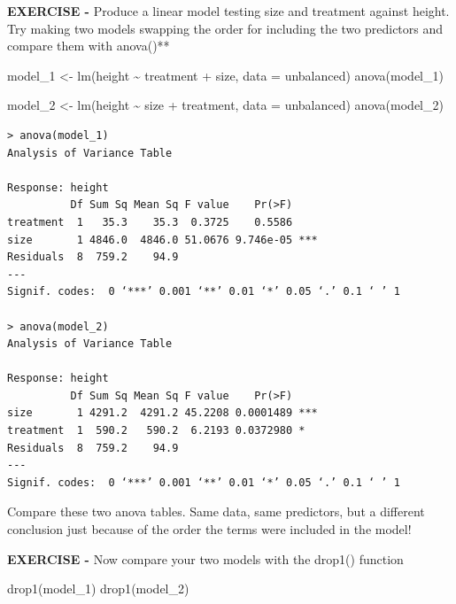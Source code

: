 \documentclass[
]{book}
\newenvironment{Shaded}{\begin{snugshade}}{\end{snugshade}}
\newcommand{\AttributeTok}[1]{\textcolor[rgb]{0.77,0.63,0.00}{#1}}
\newcommand{\FunctionTok}[1]{\textcolor[rgb]{0.00,0.00,0.00}{#1}}
\newcommand{\NormalTok}[1]{#1}
\newcommand{\OtherTok}[1]{\textcolor[rgb]{0.56,0.35,0.01}{#1}}
\newcommand{\SpecialCharTok}[1]{\textcolor[rgb]{0.00,0.00,0.00}{#1}}
\begin{document}
\textbf{EXERCISE -} Produce a linear model testing size and treatment against height. Try making two models swapping the order for including the two predictors and compare them with anova()**

\begin{Shaded}
\begin{Highlighting}[]
\NormalTok{model\_1 }\OtherTok{\textless{}{-}} \FunctionTok{lm}\NormalTok{(height }\SpecialCharTok{\textasciitilde{}}\NormalTok{ treatment }\SpecialCharTok{+}\NormalTok{ size, }\AttributeTok{data =}\NormalTok{ unbalanced)}
\FunctionTok{anova}\NormalTok{(model\_1)}

\NormalTok{model\_2 }\OtherTok{\textless{}{-}} \FunctionTok{lm}\NormalTok{(height }\SpecialCharTok{\textasciitilde{}}\NormalTok{ size }\SpecialCharTok{+}\NormalTok{ treatment, }\AttributeTok{data =}\NormalTok{ unbalanced)}
\FunctionTok{anova}\NormalTok{(model\_2)}
\end{Highlighting}
\end{Shaded}

\begin{verbatim}
> anova(model_1)
Analysis of Variance Table

Response: height
          Df Sum Sq Mean Sq F value    Pr(>F)    
treatment  1   35.3    35.3  0.3725    0.5586    
size       1 4846.0  4846.0 51.0676 9.746e-05 ***
Residuals  8  759.2    94.9                      
---
Signif. codes:  0 ‘***’ 0.001 ‘**’ 0.01 ‘*’ 0.05 ‘.’ 0.1 ‘ ’ 1

> anova(model_2)
Analysis of Variance Table

Response: height
          Df Sum Sq Mean Sq F value    Pr(>F)    
size       1 4291.2  4291.2 45.2208 0.0001489 ***
treatment  1  590.2   590.2  6.2193 0.0372980 *  
Residuals  8  759.2    94.9                      
---
Signif. codes:  0 ‘***’ 0.001 ‘**’ 0.01 ‘*’ 0.05 ‘.’ 0.1 ‘ ’ 1
\end{verbatim}

Compare these two anova tables. Same data, same predictors, but a different conclusion just because of the order the terms were included in the model!

\textbf{EXERCISE -} Now compare your two models with the drop1() function

\begin{Shaded}
\begin{Highlighting}[]
\FunctionTok{drop1}\NormalTok{(model\_1)}
\FunctionTok{drop1}\NormalTok{(model\_2)}
\end{Highlighting}
\end{Shaded}
\end{document}
